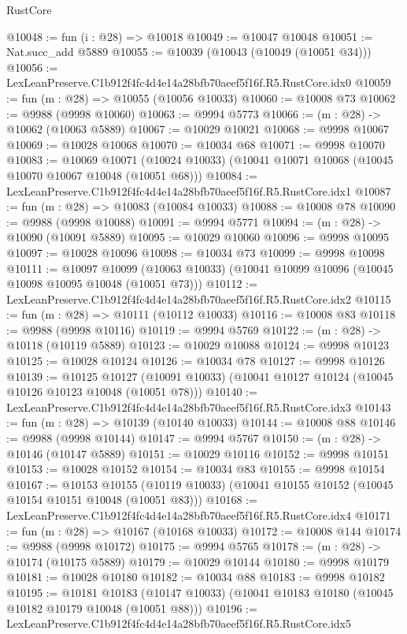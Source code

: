 \begin{lexlean}{RustCore}
\begin{coremodule}
@10048 := fun (i : @28) => @10018
@10049 := @10047 @10048
@10051 := Nat.succ_add @5889
@10055 := @10039 (@10043 (@10049 (@10051 @34)))
@10056 := LexLeanPreserve.C1b912f4fc4d4e14a28bfb70aeef5f16f.R5.RustCore.idx0
@10059 := fun (m : @28) => @10055 (@10056 @10033)
@10060 := @10008 @73
@10062 := @9988 (@9998 @10060)
@10063 := @9994 @5773
@10066 := (m : @28) -> @10062 (@10063 @5889)
@10067 := @10029 @10021
@10068 := @9998 @10067
@10069 := @10028 @10068
@10070 := @10034 @68
@10071 := @9998 @10070
@10083 := @10069
    @10071
    (@10024 @10033)
    (@10041 @10071 @10068 (@10045 @10070 @10067 @10048 (@10051 @68)))
@10084 := LexLeanPreserve.C1b912f4fc4d4e14a28bfb70aeef5f16f.R5.RustCore.idx1
@10087 := fun (m : @28) => @10083 (@10084 @10033)
@10088 := @10008 @78
@10090 := @9988 (@9998 @10088)
@10091 := @9994 @5771
@10094 := (m : @28) -> @10090 (@10091 @5889)
@10095 := @10029 @10060
@10096 := @9998 @10095
@10097 := @10028 @10096
@10098 := @10034 @73
@10099 := @9998 @10098
@10111 := @10097
    @10099
    (@10063 @10033)
    (@10041 @10099 @10096 (@10045 @10098 @10095 @10048 (@10051 @73)))
@10112 := LexLeanPreserve.C1b912f4fc4d4e14a28bfb70aeef5f16f.R5.RustCore.idx2
@10115 := fun (m : @28) => @10111 (@10112 @10033)
@10116 := @10008 @83
@10118 := @9988 (@9998 @10116)
@10119 := @9994 @5769
@10122 := (m : @28) -> @10118 (@10119 @5889)
@10123 := @10029 @10088
@10124 := @9998 @10123
@10125 := @10028 @10124
@10126 := @10034 @78
@10127 := @9998 @10126
@10139 := @10125
    @10127
    (@10091 @10033)
    (@10041 @10127 @10124 (@10045 @10126 @10123 @10048 (@10051 @78)))
@10140 := LexLeanPreserve.C1b912f4fc4d4e14a28bfb70aeef5f16f.R5.RustCore.idx3
@10143 := fun (m : @28) => @10139 (@10140 @10033)
@10144 := @10008 @88
@10146 := @9988 (@9998 @10144)
@10147 := @9994 @5767
@10150 := (m : @28) -> @10146 (@10147 @5889)
@10151 := @10029 @10116
@10152 := @9998 @10151
@10153 := @10028 @10152
@10154 := @10034 @83
@10155 := @9998 @10154
@10167 := @10153
    @10155
    (@10119 @10033)
    (@10041 @10155 @10152 (@10045 @10154 @10151 @10048 (@10051 @83)))
@10168 := LexLeanPreserve.C1b912f4fc4d4e14a28bfb70aeef5f16f.R5.RustCore.idx4
@10171 := fun (m : @28) => @10167 (@10168 @10033)
@10172 := @10008 @144
@10174 := @9988 (@9998 @10172)
@10175 := @9994 @5765
@10178 := (m : @28) -> @10174 (@10175 @5889)
@10179 := @10029 @10144
@10180 := @9998 @10179
@10181 := @10028 @10180
@10182 := @10034 @88
@10183 := @9998 @10182
@10195 := @10181
    @10183
    (@10147 @10033)
    (@10041 @10183 @10180 (@10045 @10182 @10179 @10048 (@10051 @88)))
@10196 := LexLeanPreserve.C1b912f4fc4d4e14a28bfb70aeef5f16f.R5.RustCore.idx5

\end{coremodule}
\end{lexlean}
